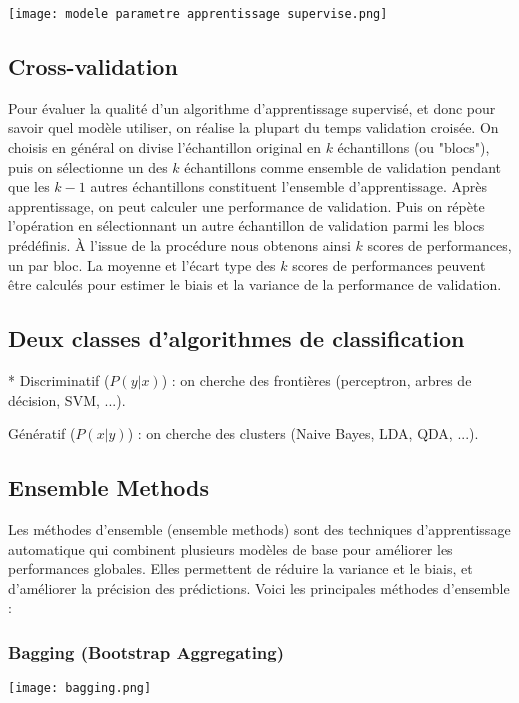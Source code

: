 \documentclass[10pt,a4paper]{article}
\begin{document}
\texttt{[image: modele parametre apprentissage supervise.png]}

\subsection*{Cross-validation}

Pour évaluer la qualité d'un algorithme d'apprentissage supervisé, et donc pour savoir quel modèle utiliser, on réalise la plupart du temps validation croisée. On choisis en général on divise l'échantillon original en $k$ échantillons (ou "blocs"), puis on sélectionne un des $k$ échantillons comme ensemble de validation pendant que les $k-1$ autres échantillons constituent l'ensemble d'apprentissage. Après apprentissage, on peut calculer une performance de validation. Puis on répète l'opération en sélectionnant un autre échantillon de validation parmi les blocs prédéfinis. À l'issue de la procédure nous obtenons ainsi $k$ scores de performances, un par bloc. La moyenne et l'écart type des $k$ scores de performances peuvent être calculés pour estimer le biais et la variance de la performance de validation.

\subsection*{Deux classes d'algorithmes de classification}*
Discriminatif ($P(y|x)$) : on cherche des frontières (perceptron, arbres de décision, SVM, ...).

Génératif ($P(x|y)$) : on cherche des clusters (Naive Bayes, LDA, QDA, ...).

\subsection*{Ensemble Methods}

Les méthodes d'ensemble (ensemble methods) sont des techniques d'apprentissage automatique qui combinent plusieurs modèles de base pour améliorer les performances globales. Elles permettent de réduire la variance et le biais, et d'améliorer la précision des prédictions. Voici les principales méthodes d'ensemble :

\subsubsection*{Bagging (Bootstrap Aggregating)}

\texttt{[image: bagging.png]}
\end{document}
